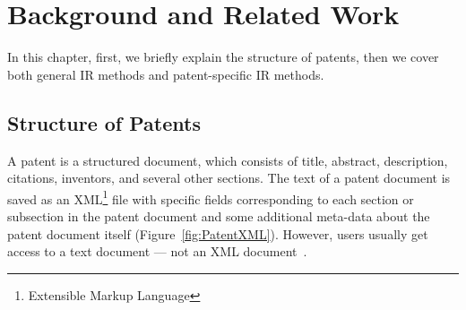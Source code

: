 \chapter{Background and Related Work}
\label{cha:background}
In this chapter, first, we briefly explain the structure of patents, then we cover both general IR methods and patent-specific IR methods.
\section{Structure of Patents}
\label{StructureofPatents}
A patent is a structured document, which consists of 
title, abstract, description, citations, inventors, and several other sections.
The text of a patent document is saved
as an XML\footnote{Extensible Markup Language} file with specific fields corresponding to each
section or subsection in the patent document and some additional meta-data about the patent
document itself (Figure~\ref{fig:PatentXML}). However, users usually get access to a text document --- not an
XML document~\citep{magdy2012toward}.
